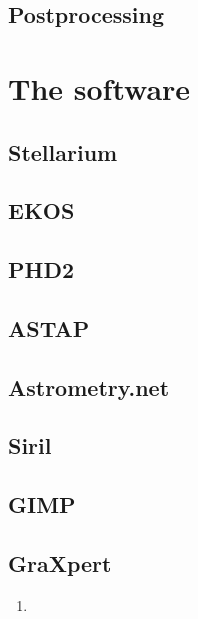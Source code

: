 \documentclass[a4paper,landscape,english,12pt]{article}
\begin{document}
\begin{multicols}{2}
\subsection{Postprocessing}

\section{The software}

\subsection{Stellarium}

\subsection{EKOS}

\subsection{PHD2}

\subsection{ASTAP}

\subsection{Astrometry.net}

\subsection{Siril}

\subsection{GIMP}

\subsection{GraXpert}

\begin{enumerate}
	\item 
\end{enumerate}


\end{multicols}

\newpage
\end{document}
